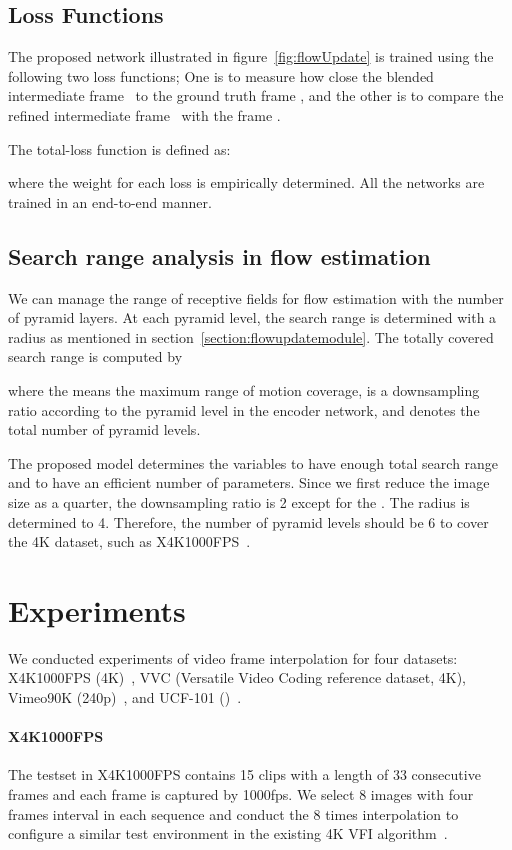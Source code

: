 \documentclass[10pt,twocolumn,letterpaper]{article}
\begin{document}
\subsection{Loss Functions}
The proposed network illustrated in figure~\ref{fig:flowUpdate} is trained using the following two loss functions; One is to measure how close the blended intermediate frame~ to the ground truth frame , and the other is to compare the refined intermediate frame~ with the frame . 




The total-loss function is defined as:

where the weight for each loss is empirically determined.
All the networks are trained in an end-to-end manner.

\subsection{Search range analysis in flow estimation}
We can manage the range of receptive fields for flow estimation with the number of pyramid layers. At each pyramid level, the search range is determined with a radius  as mentioned in section~\ref{section:flowupdatemodule}. The totally covered search range is computed by

where the  means the maximum range of motion coverage,  is a downsampling ratio according to the pyramid level in the encoder network, and  denotes the total number of pyramid levels.

The proposed model determines the variables to have enough total search range and to have an efficient number of parameters. 
Since we first reduce the image size as a quarter, the downsampling ratio is 2 except for the . 
The radius  is determined to 4. 
Therefore, the number of pyramid levels should be 6 to cover the 4K dataset, such as X4K1000FPS~\cite{sim2021xvfi}.


\section{Experiments}
We conducted experiments of video frame interpolation for four datasets: X4K1000FPS (4K)~\cite{sim2021xvfi}, VVC (Versatile Video Coding reference dataset, 4K), Vimeo90K (240p)~\cite{xue2019video}, and UCF-101 ()~\cite{soomro2012ucf101}.
\paragraph{X4K1000FPS~\cite{sim2021xvfi}}
The testset in X4K1000FPS contains 15 clips with a length of 33 consecutive frames and each frame is captured by 1000fps. 
We select 8 images with four frames interval in each sequence and conduct the 8 times interpolation to configure a similar test environment in the existing 4K VFI algorithm~\cite{sim2021xvfi}.
\end{document}
